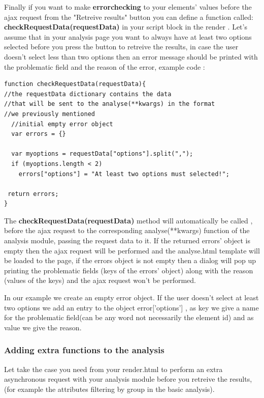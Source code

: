 \documentclass{lhcbnote}
\begin{document}
Finally if you want to make {\bf errorchecking} to your elements' values before the ajax request from the "Retreive results" button you
can define a function called: {\bf checkRequestData(requestData)} in your script block in the render . Let's assume that in your analysis
page you want to always have at least two options selected before you press the button to retreive the results, in case the user doesn't
select less than two options then an error message should be printed with the problematic field and the reason of the error, example code :

\begin{verbatim}
function checkRequestData(requestData){
//the requestData dictionary contains the data 
//that will be sent to the analyse(**kwargs) in the format
//we previously mentioned
  //initial empty error object
  var errors = {}
 
  var myoptions = requestData["options"].split(",");
  if (myoptions.length < 2)
    errors["options"] = "At least two options must selected!";

 return errors;
}
\end{verbatim}

The {\bf checkRequestData(requestData)} method will automatically be called , before the ajax request to the corresponding analyse(**kwargs) function of the analysis module, 
 passing the request data to it. If the returned errors' object is empty then the ajax request will be performed and the analyse.html template will be loaded to the page, if the 
errors object is not empty then a dialog will pop up printing the problematic fields (keys of the errors' object) along with the reason (values of the keys) and the ajax request 
won't be performed. 

In our example we create an empty error object.
If the user doesn't select at least two options we add an entry to the object error['options'] , as key we give a name for the problematic field(can be any word not necessarily the element id) and as
value we give the reason.

\subsubsection{Adding extra functions to the analysis}

Let take the case you need from your render.html to perform an extra asynchronous request with your analysis module before you retreive the results,
(for example the attributes filtering by group in the basic analysis). 
\end{document}
